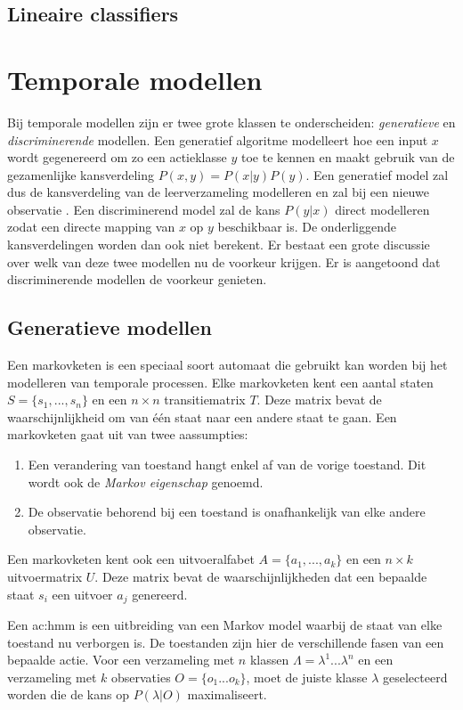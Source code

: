 \subsection{Lineaire classifiers}


\section{Temporale modellen}
\label{subsec:temporale_modellen}
Bij temporale modellen zijn er twee grote klassen te onderscheiden: \textit{generatieve} en \textit{discriminerende} modellen. Een generatief algoritme modelleert hoe een input $x$ wordt gegenereerd om zo een actieklasse $y$ toe te kennen en maakt gebruik van de gezamenlijke kansverdeling $P(x, y) = P(x|y)P(y)$. Een generatief model zal dus de kansverdeling van de leerverzameling modelleren en zal bij een nieuwe observatie . Een discriminerend model zal de kans $P(y|x)$ direct modelleren zodat een directe mapping van $x$ op $y$ beschikbaar is. De onderliggende kansverdelingen worden dan ook niet berekent.
 Er bestaat een grote discussie over welk van deze twee modellen nu de voorkeur krijgen. Er is aangetoond \cite{Andrew2002} dat discriminerende modellen de voorkeur genieten.

\subsection{Generatieve modellen}
Een markovketen is een speciaal soort automaat die gebruikt kan worden bij het modelleren van temporale processen. Elke markovketen kent een aantal staten $S = \{s_1, ..., s_n\}$ en een $n \times n$ transitiematrix $T$. Deze matrix bevat de waarschijnlijkheid om van één staat naar een andere staat te gaan. Een markovketen gaat uit van twee aassumpties:
\begin{enumerate}
	\item Een verandering van toestand hangt enkel af van de vorige toestand. Dit wordt ook de \textit{Markov eigenschap} genoemd.
	\item De observatie behorend bij een toestand is onafhankelijk van elke andere observatie.
\end{enumerate}
Een markovketen kent ook een uitvoeralfabet $A = \{a_1, ..., a_k\}$ en een $n \times k$ uitvoermatrix $U$. Deze matrix bevat de waarschijnlijkheden dat een bepaalde staat $s_i$ een uitvoer $a_j$ genereerd. 

Een \gls{ac:hmm} is een uitbreiding van een Markov model waarbij de staat van elke toestand nu verborgen is. De toestanden zijn hier de verschillende fasen van een bepaalde actie. Voor een verzameling met $n$ klassen $\Lambda = \lambda^1 ... \lambda^n$ en een verzameling met $k$ observaties $O = \{o_1 ... o_k\}$, moet de juiste klasse $\lambda$ geselecteerd worden die de kans op $P(\lambda | O)$ maximaliseert.


